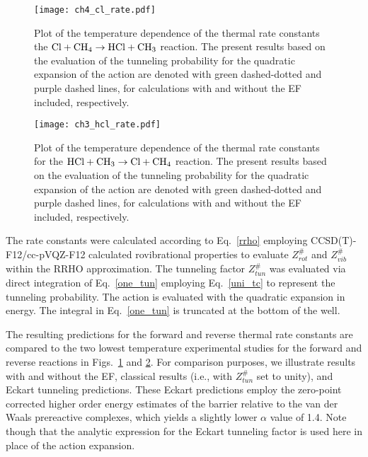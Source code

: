 \documentclass[journal=jpcafh,manuscript=article]{achemso}
\begin{document}
\begin{figure}[p]
\begin{center}
\texttt{[image: ch4\_cl\_rate.pdf]}
\caption{
Plot of the temperature dependence of the thermal rate
constants the $\rm Cl + CH_4\rightarrow HCl + CH_3$
reaction. The present results based on the evaluation of the tunneling
probability for the quadratic expansion of the action are denoted with
green dashed-dotted and purple dashed lines, for calculations with and
without the EF included, respectively.
}
\label{ch4_cl_fig}
\end{center}
\end{figure}

\begin{figure}[p]
\begin{center}
\texttt{[image: ch3\_hcl\_rate.pdf]}
\caption{
Plot of the temperature dependence of the thermal rate
constants for the $\rm HCl + CH_3\rightarrow Cl + CH_4$
reaction. The present results based on the evaluation of the tunneling
probability for the quadratic expansion of the action are denoted with
green dashed-dotted and purple dashed lines, for calculations with and
without the EF included, respectively.
}
\label{ch3_hcl_fig}
\end{center}
\end{figure}

 The rate constants were calculated according to Eq.~\ref{rrho}
employing CCSD(T)-F12/cc-pVQZ-F12 calculated rovibrational properties
to evaluate $Z_{rot}^\#$ and $Z_{vib}^\#$ within the RRHO
approximation. The tunneling factor $Z_{tun}^\#$ was evaluated via
direct integration of Eq.~\ref{one_tun} employing Eq.~\ref{uni_tc} to
represent the tunneling probability.  The action is evaluated with the
quadratic expansion in energy. The integral in Eq.~\ref{one_tun} is
truncated at the bottom of the well.

The resulting predictions for the forward and reverse thermal rate
constants are compared to the two lowest temperature experimental
studies for the forward and reverse reactions in
Figs.~\ref{ch4_cl_fig} and \ref{ch3_hcl_fig}. For comparison purposes,
we illustrate results with and without the EF, classical results
(i.e., with $Z_{tun}^\#$ set to unity), and Eckart tunneling
predictions. These Eckart predictions employ the zero-point corrected
higher order energy estimates of the barrier relative to the van der
Waals prereactive complexes, which yields a slightly lower $\alpha$
value of 1.4. Note though that the analytic expression for the Eckart
tunneling factor is used here in place of the action expansion.
\end{document}
